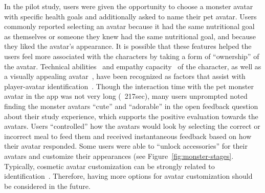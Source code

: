 In the pilot study, users were given the opportunity to choose a monster avatar with specific health goals and additionally asked to name their pet avatar. 
Users commonly reported selecting an avatar because it had the same nutritional goal as themselves or someone they knew had the same nutritional goal, and because they liked the avatar's appearance. 
It is possible that these features helped the users feel more associated with the characters by taking a form of ``ownership'' of the avatar. 
Technical abilities~\cite{newman2002myth} and empathy capacity~\cite{cohen2006audience} of the character, as well as a visually appealing avatar~\cite{kim2012became}, have been recognized as factors that assist with player-avatar identification~\cite{turkay2014effects}.
Though the interaction time with the pet monster avatar in the app was not very long (~217sec), many users unprompted noted finding the monster avatars ``cute'' and ``adorable'' in the open feedback question about their study experience, which supports the positive evaluation towards the avatars.
Users ``controlled'' how the avatars would look by selecting the correct or incorrect meal to feed them and received instantaneous feedback based on how their avatar responded. 
Some users were able to ``unlock accessories'' for their avatars and customize their appearances (see Figure~\ref{fig:monster-stages}.
Typically, cosmetic avatar customization can be strongly related to identification~\cite{turkay2014effects}. Therefore, %
having more options for avatar customization 
should be considered in the future. 





\vspace{-5pt}
